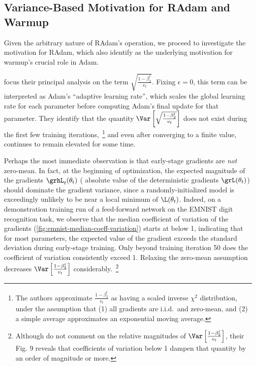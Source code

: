 {\subsection{Variance-Based Motivation for RAdam and Warmup}
\label{sec:radam-variance}

Given the arbitrary nature of RAdam's operation, we proceed to investigate the motivation for RAdam, which \citeauthor{liu2019radam} also identify as the underlying motivation for warmup's crucial role in Adam.

\citeauthor{liu2019radam} focus their principal analysis on the term $\sqrt{\frac{1 - \beta_2^t}{v_t}}$. Fixing $\epsilon = 0$, this term can be interpreted as Adam's ``adaptive learning rate'', which scales the global learning rate for each parameter before computing Adam's final update for that parameter. They identify that the quantity $\Var \left[ \sqrt{\frac{1 - \beta_2^t}{v_t}} \right]$ does not exist during the first few training iterations,~\footnote{The authors approximate $\frac{1 - \beta_2^t}{v_t}$ as having a scaled inverse $\chi^2$ distribution, under the assumption that (1) all gradients are i.i.d.\ and zero-mean, and (2) a simple average approximates an exponential moving average.} and even after converging to a finite value, continues to remain elevated for some time.

Perhaps the most immediate observation is that early-stage gradients are \emph{not} zero-mean. In fact, at the beginning of optimization, the expected magnitude of the gradients $\grhL_t(\theta_t)$ (\ie{} absolute value of the deterministic gradients $\grL(\theta_t)$) should dominate the gradient variance, since a randomly-initialized model is exceedingly unlikely to be near a local minimum of $\L(\theta_t)$. Indeed, on a demonstration training run of a feed-forward network on the EMNIST digit recognition task, we observe that the median coefficient of variation of the gradients (\cref*{fig:emnist-median-coeff-variation}) starts at below 1, indicating that for most parameters, the expected value of the gradient exceeds the standard deviation during early-stage training. Only beyond training iteration 50 does the coefficient of variation consistently exceed 1. Relaxing the zero-mean assumption decreases $\Var \left[ \frac{1 - \beta_2^t}{v_t} \right]$ considerably.~\footnote{Although \citeauthor{liu2019radam} do not comment on the relative magnitudes of $\Var \left[ \frac{1 - \beta_2^t}{v_t} \right]$, their Fig. 9 reveals that coefficients of variation below 1 dampen that quantity by an order of magnitude or more.}

}
